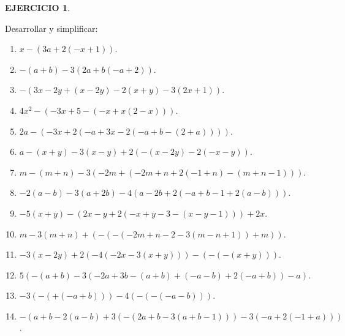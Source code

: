 \documentclass[12pt,letterpaper]{article}
\theoremstyle{definition}
\newtheorem{ejer}{EJERCICIO}
\begin{document}
\begin{ejer}\

Desarrollar y simplificar: %
\begin{enumerate}
\item $x-(3a+2(-x+1))$.
\item $-(a+b)-3(2a+b(-a+2))$.
\item $-(3x-2y+(x-2y)-2(x+y)-3(2x+1))$.
\item $4x^2-(-3x+5-(-x+x(2-x)))$.
\item $2a-(-3x+2(-a+3x-2(-a+b-(2+a))))$.
\item $a-(x+y)-3(x-y)+2(-(x-2y)-2(-x-y))$.
\item $m-(m+n)-3(-2m+(-2m+n+2(-1+n)-(m+n-1)))$.
\item $-2(a-b)-3(a+2b)-4(a-2b+2(-a+b-1+2(a-b)))$.
\item $-5(x+y)-(2x-y+2(-x+y-3-(x-y-1)))+2x$.
\item $m-3(m+n)+(-(-(-2m+n-2-3(m-n+1))+m))$.
\item $-3(x-2y)+2(-4(-2x-3(x+y)))-(-(-(x+y)))$.
\item $5(-(a+b)-3(-2a+3b-(a+b)+(-a-b)+2(-a+b))-a)$.
\item $-3(-(+(-a+b)))-4(-(-(-a-b)))$.
\item $-(a+b-2(a-b)+3(-(2a+b-3(a+b-1)))-3(-a+2(-1+a)))$.
\end{enumerate}
\end{ejer}
\end{document}
